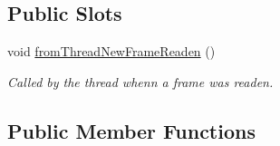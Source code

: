 \subsection*{Public Slots}
\begin{DoxyCompactItemize}
\item 
void \hyperlink{classmdt_usbtmc_port_manager_aca42b343ae1f6a324e6e45968f03bbea}{fromThreadNewFrameReaden} ()
\begin{DoxyCompactList}\small\item\em Called by the thread whenn a frame was readen. \end{DoxyCompactList}\end{DoxyCompactItemize}
\subsection*{Public Member Functions}
